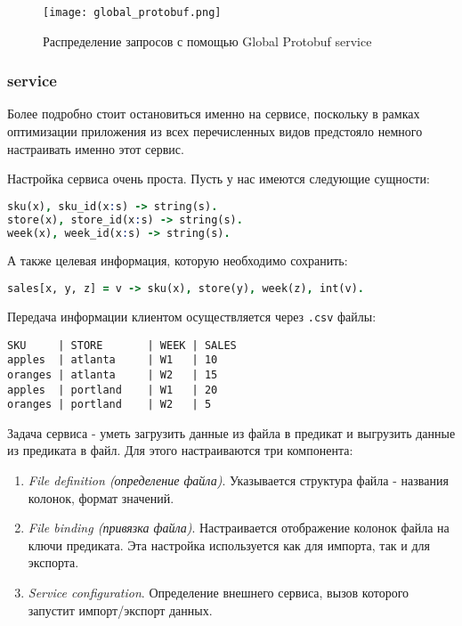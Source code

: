 \begin{figure}
	\centering
	\texttt{[image: global\_protobuf.png]}
	\caption{Распределение запросов с помощью Global Protobuf service \cite{lb_web_services}}
	\label{fig:technology:web_services:global_protobuf}
\end{figure}


\subsubsection{\tdx service}
\label{sec:technology:web_services:tdx}

Более подробно стоит остановиться именно на \tdx сервисе, поскольку в рамках оптимизации приложения из всех перечисленных видов предстояло немного настраивать именно этот сервис.

Настройка сервиса очень проста. Пусть у нас имеются следующие сущности:

\begin{lstlisting}[language=Prolog]
sku(x), sku_id(x:s) -> string(s).
store(x), store_id(x:s) -> string(s).
week(x), week_id(x:s) -> string(s).
\end{lstlisting}

А также целевая информация, которую необходимо сохранить:

\begin{lstlisting}[language=Prolog]
sales[x, y, z] = v -> sku(x), store(y), week(z), int(v).
\end{lstlisting}

Передача информации клиентом осуществляется через \lstinline{.csv} файлы:

\begin{lstlisting}[language=CSV]
SKU     | STORE       | WEEK | SALES
apples  | atlanta     | W1   | 10
oranges | atlanta     | W2   | 15
apples  | portland    | W1   | 20
oranges | portland    | W2   | 5
\end{lstlisting}

Задача \tdx сервиса - уметь загрузить данные из файла в предикат и выгрузить данные из предиката в файл. Для этого настраиваются три компонента:

\begin{enumerate}
  \item \emph{File definition (определение файла)}. Указывается структура файла - названия колонок, формат значений.
  \item \emph{File binding (привязка файла)}. Настраивается отображение колонок файла на ключи предиката. Эта настройка используется как для импорта, так и для экспорта.
  \item \emph{Service configuration}. Определение внешнего сервиса, вызов которого запустит импорт/экспорт данных.
\end{enumerate}

